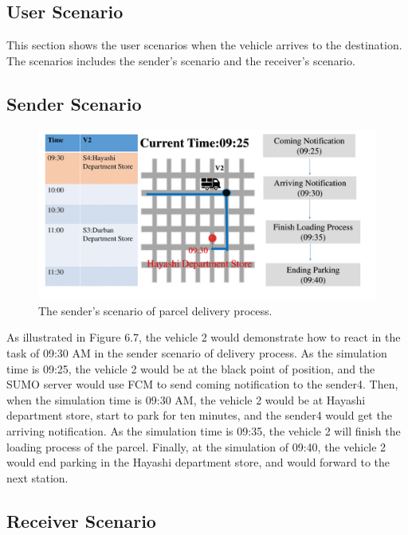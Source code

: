 \documentclass[12pt]{ksthesis}
\begin{document}
\begin{thesis}
{\section{User Scenario}

This section shows the user scenarios when the vehicle arrives to the destination. The scenarios includes the sender's scenario and the receiver's scenario.

\subsection{Sender Scenario}

\begin{figure}[H]
\centering
\includegraphics[width=1.14\textwidth]{./Thesis_figures/F6-7_senderScenario.PNG}
\caption{\large The sender's scenario of parcel delivery process.}
\vspace{0.5cm}
\label{Fig:senderScenario_DeliveryPorcess}
\end{figure}

As illustrated in Figure 6.7, the vehicle 2 would demonstrate how to react in the task of 09:30 AM in the sender scenario of delivery process. As the simulation time is 09:25, the vehicle 2 would be at the black point of position, and the SUMO server would use FCM to send coming notification to the sender4. Then, when the simulation time is 09:30 AM, the vehicle 2 would be at Hayashi department store, start to park for ten minutes, and the sender4 would get the arriving notification.
As the simulation time is 09:35, the vehicle 2 will finish the loading process of the parcel. Finally, at the simulation of 09:40, the vehicle 2 would end parking in the Hayashi department store, and would forward to the next station.

\subsection{Receiver Scenario}

}
\end{thesis}
\end{document}

